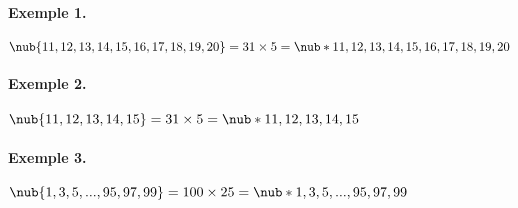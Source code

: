 \documentclass[border=3pt]{standalone}
\begin{document}
\begin{minipage}{12cm}

\paragraph{Exemple 1.}

$ \nub{11, 12, 13, 14, 15, 16, 17, 18, 19, 20}%
= 31 \times 5 %
= \nub*{11, 12, 13, 14, 15, 16, 17, 18, 19, 20}$

\paragraph{Exemple 2.}

$ \nub{11, 12, 13, 14, 15}%
= 31 \times 5 %
= \nub*{11, 12, 13, 14, 15}$

\paragraph{Exemple 3.}

$ \nub{1, 3, 5, ... , 95, 97, 99}%
= 100 \times 25%
= \nub*{1, 3, 5, ... , 95, 97, 99}$

\end{minipage}
\end{document}
